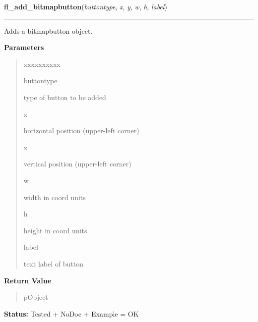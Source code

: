     \label{xformslib:library:fl_add_bitmapbutton}

    \vspace{0.5ex}

\hspace{.8\funcindent}\begin{boxedminipage}{\funcwidth}

    \raggedright \textbf{fl\_add\_bitmapbutton}(\textit{buttontype}, \textit{x}, \textit{y}, \textit{w}, \textit{h}, \textit{label})

    \vspace{-1.5ex}

    \rule{\textwidth}{0.5\fboxrule}
\setlength{\parskip}{2ex}
    Adds a bitmapbutton object.

\setlength{\parskip}{1ex}
      \textbf{Parameters}
      \vspace{-1ex}

      \begin{quote}
        \begin{Ventry}{xxxxxxxxxx}

          \item[buttontype]

          type of button to be added

          \item[x]

          horizontal position (upper-left corner)

          \item[x]

          vertical position (upper-left corner)

          \item[w]

          width in coord units

          \item[h]

          height in coord units

          \item[label]

          text label of button

        \end{Ventry}

      \end{quote}

      \textbf{Return Value}
    \vspace{-1ex}

      \begin{quote}
      pObject

      \end{quote}

\textbf{Status:} Tested + NoDoc + Example = OK



    \end{boxedminipage}

